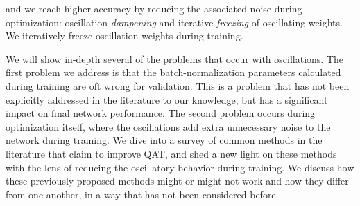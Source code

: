 
and we reach higher accuracy by reducing the associated noise during optimization: oscillation \textit{dampening} and iterative \textit{freezing} of oscillating weights. We 
iteratively freeze oscillation weights during training.






We will show in-depth several of the problems that occur with oscillations. The first problem we address is that the batch-normalization parameters calculated during training are oft wrong for validation. This is a problem that has not been explicitly addressed in the literature to our knowledge, but has a significant impact on final network performance. The second problem occurs during optimization itself, where the oscillations add extra unnecessary noise to the network during training. We dive into a survey of common methods in the literature that claim to improve QAT, and shed a new light on these methods with the lens of reducing the oscillatory behavior during training. We discuss how these previously proposed methods might or might not work and how they differ from one another, in a way that has not been considered before.


